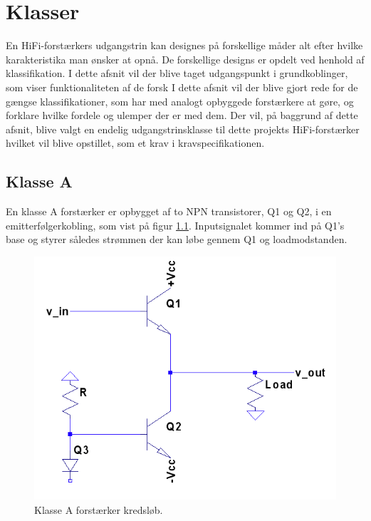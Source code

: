 \chapter{Klasser}
En HiFi-forstærkers udgangstrin kan designes på forskellige måder alt efter hvilke karakteristika man ønsker at opnå. De forskellige designs er opdelt ved henhold af klassifikation. I dette afsnit vil der blive taget udgangspunkt i grundkoblinger, som viser funktionaliteten af de forsk 
I dette afsnit vil der blive gjort rede for de gængse klassifikationer, som har med analogt opbyggede forstærkere at gøre, og forklare hvilke fordele og ulemper der er med dem. Der vil, på baggrund af dette afsnit, blive valgt en endelig udgangstrinsklasse til dette projekts HiFi-forstærker hvilket vil blive opstillet, som et krav i kravspecifikationen.

\section{Klasse A}

En klasse A forstærker er opbygget af to NPN transistorer, Q1 og Q2, i en emitterfølgerkobling, som vist på figur \ref{fig:classa}. Inputsignalet kommer ind på Q1's base og styrer således strømmen der kan løbe gennem Q1 og loadmodstanden. 

\begin{figure}[h]
\centering
\includegraphics[scale=.6]{klasser/classa.png}
\caption{Klasse A forstærker kredsløb.}
\label{fig:classa}
\end{figure}


